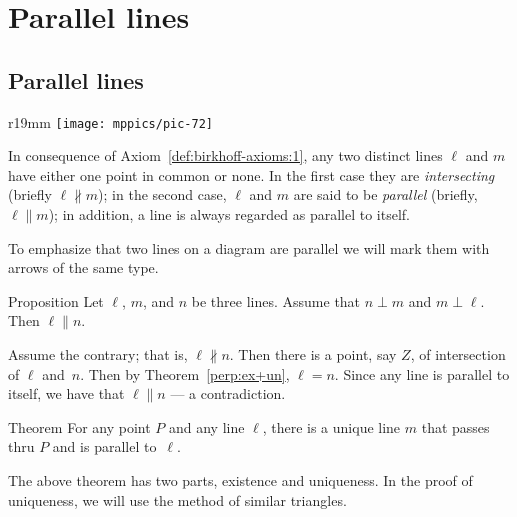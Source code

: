 \chapter[Parallel lines]{Parallel lines}\label{chap:angle-sum}

\section*{Parallel lines}

{

\begin{wrapfigure}{r}{19mm}
\vskip-4mm
\centering
\texttt{[image: mppics/pic-72]}
\end{wrapfigure}

In consequence of Axiom~\ref{def:birkhoff-axioms:1}, 
any two distinct lines $\ell$ and $m$ have either one point
in common or none. 
In the first case they are \emph{intersecting} (briefly $\ell\nparallel m$); 
in the second case, $\ell$ and $m$ are said to be \emph{parallel} (briefly, $\ell\parallel m$);
in addition, a line is always regarded as parallel to itself.

}

To emphasize that two lines on a diagram are parallel we will mark them with arrows of the same type.



\begin{thm}[\abs]{Proposition}\label{prop:perp-perp} Let $\ell$, $m$, and $n$ be three lines.
Assume that $n\perp m$ and $m\perp \ell$.
Then $\ell\parallel n$. 
\end{thm}

Assume the contrary; 
that is, $\ell\nparallel n$.
Then there is a point, say $Z$, of intersection of $\ell$ and~$n$.
Then by Theorem~\ref{perp:ex+un},
$\ell=n$.
Since any line is parallel to itself, we have that $\ell\parallel n$ --- a contradiction.
\qeds

\begin{thm}{Theorem}\label{thm:parallel}
For any point $P$ and any line $\ell$,
there is a unique line $m$
that passes thru $P$ and is parallel to~$\ell$.
\end{thm}

The above theorem has two parts, existence and uniqueness.
In the proof of uniqueness, we will use the method of similar triangles.

